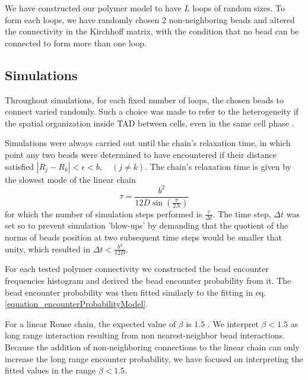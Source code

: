 \documentclass[12pt]{article}
\begin{document}
We have constructed our polymer model to have $L$ loops of random sizes. To form each loops, we have randomly chosen 2 non-neighboring beads and altered the connectivity in the Kirchhoff matrix, with the condition that no bead can be connected to form more than one loop.

\subsection{Simulations}\label{subsection_simulations}
Throughout simulations, for each fixed number of loops, the chosen beads to connect varied randomly. Such a choice was made to refer to the heterogeneity if the spatial organization inside TAD between cells, even in the same cell phase \cite{Nora2012}.

Simulations were always carried out until the chain's relaxation time, in which point any two beads were determined to have encountered if their distance satisfied $|R_j-R_k|<\epsilon<b,\quad  (j\ne k)$.
The chain's relaxation time is given by the slowest mode of the linear chain
\begin{equation*}
\tau =\frac{b^2}{12D\sin(\frac{\pi}{2N})}
\end{equation*}
for which the number of simulation steps performed is $\frac{\tau}{\Delta t} $. The time step, $\Delta t$ was set so to prevent simulation 'blow-ups' by demanding that the quotient of the norms of beads position at two subsequent time steps would be smaller that unity, which resulted in $\Delta t < \frac{b^2}{12D}$.

For each tested polymer connectivity we constructed the bead encounter frequencies histogram and derived the bead encounter probability from it. The bead encounter probability was then fitted similarly to the fitting in eq. \ref{equation_encounterProbabilityModel}.

For a linear Rouse chain, the expected value of $\beta$ is $1.5$ \cite{doi1986theory}. We interpret $\beta<1.5$ as long range interaction resulting from non nearest-neighbor bead interactions.
Because the addition of non-neighboring connections to the linear chain can only increase the long range encounter probability, we have focused on interpreting the fitted values in the range $\beta<1.5$.
\end{document}
